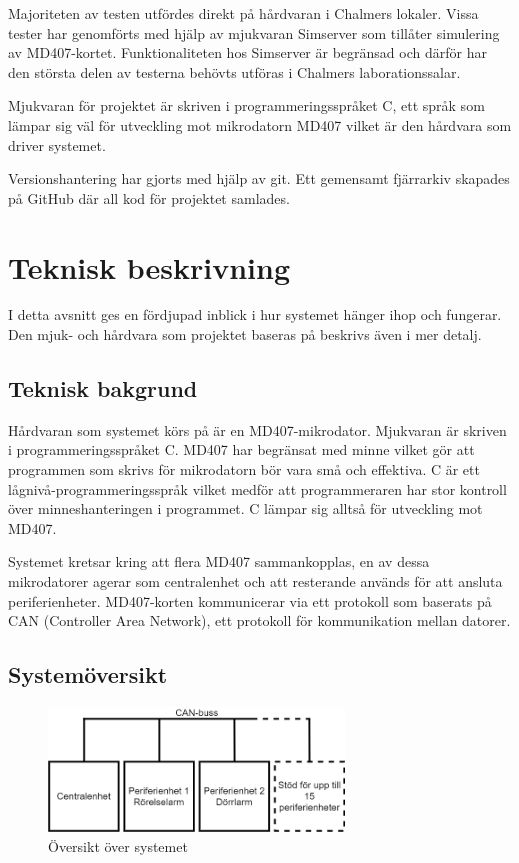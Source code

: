 \documentclass[a4paper]{article}
\begin{document}
Majoriteten av testen utfördes direkt på hårdvaran i Chalmers lokaler.
Vissa tester har genomförts med hjälp av mjukvaran Simserver som tillåter simulering av MD407-kortet.
Funktionaliteten hos Simserver är begränsad och därför har den största delen av testerna behövts utföras i Chalmers laborationssalar.

Mjukvaran för projektet är skriven i programmeringsspråket C, ett språk som lämpar sig väl för utveckling mot mikrodatorn MD407 vilket är den hårdvara som driver systemet.

Versionshantering har gjorts med hjälp av git.
Ett gemensamt fjärrarkiv skapades på GitHub där all kod för projektet samlades.

\newpage

\section{Teknisk beskrivning}
I detta avsnitt ges en fördjupad inblick i hur systemet hänger ihop och fungerar.
Den mjuk- och hårdvara som projektet baseras på beskrivs även i mer detalj.

\subsection{Teknisk bakgrund}
Hårdvaran som systemet körs på är en MD407-mikrodator.
Mjukvaran är skriven i programmeringsspråket C.
MD407 har begränsat med minne vilket gör att programmen som skrivs för mikrodatorn bör vara små och effektiva.
C är ett lågnivå-programmeringsspråk vilket medför att programmeraren har stor kontroll över minneshanteringen i programmet.
C lämpar sig alltså för utveckling mot MD407.

Systemet kretsar kring att flera MD407 sammankopplas, en av dessa mikrodatorer agerar som centralenhet och att resterande används för att ansluta periferienheter.
MD407-korten kommunicerar via ett protokoll som baserats på CAN (Controller Area Network), ett protokoll för kommunikation mellan datorer.

\subsection{Systemöversikt}

\begin{figure}[H]
    \centering
    \includegraphics[width=0.7\textwidth]{canbuss-pp.png}
    \caption{Översikt över systemet}
    \label{fig:oversikt}
\end{figure}
\end{document}
